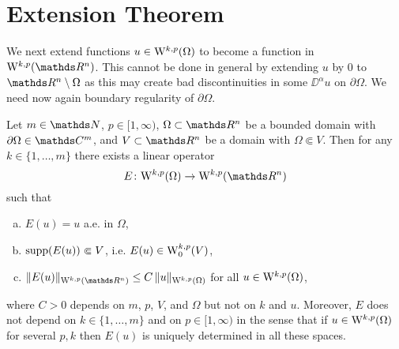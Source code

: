 \section{Extension Theorem}

We next extend functions $u \in \mathrm{W}^{k,p}(\Omega)$ to become a function in $\WW^{k,p}(\R^n)$.
This cannot be done in general by extending $u$ by $0$ to $\R^n \setminus \Omega$ as this may create bad discontinuities in some $\DD^\alpha u$ on $\partial\Omega$.
We need now again boundary regularity of $\partial\Omega$.

\begin{thm}  
  \label{thm:extension}
  Let $m \in \N$, $p \in [1,\infty)$, $\Omega \subset \R^n$ be a bounded domain with $\partial \Omega \in \C^m$, and $V \subset \R^n$ be a domain with $\Omega \Subset V$.
  Then for any $k \in \{1,\dots,m\}$ there exists a linear operator
  $$
  E \colon \WW^{k,p}(\Omega) \to \WW^{k,p}(\R^n)
  $$
  such that
  \begin{enumerate}[a)]
    \item $E(u) = u$ a.e. in $\Omega$,
    \item $\operatorname{supp}(E(u)) \Subset V$, i.e. $E(u) \in \mathrm{W}_0^{k,p}(V)$,
    \item $\|E(u)\|_{\WW^{k,p}(\R^n)} \leq C \, \| u\|_{\WW^{k,p}(\Omega)}$ for all $u \in \mathrm{W}^{k,p}(\Omega)$,
  \end{enumerate}
  where $C > 0$ depends on $m$, $p$, $V$, and $\Omega$ but not on $k$ and $u$.
  Moreover, $E$ does not depend on $k \in\{1,\dots,m\}$ and on $p \in [1,\infty)$ in the sense that if $u \in \mathrm{W}^{k,p}(\Omega)$ for several $p,k$ then $E(u)$ is uniquely determined in all these spaces.
\end{thm}

